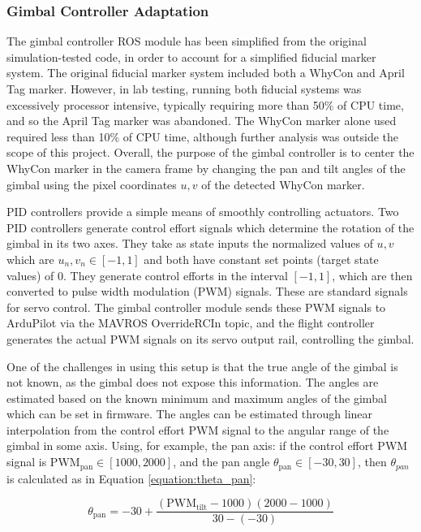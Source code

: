 \subsubsection{Gimbal Controller Adaptation}
\label{section:gimbal_controller_adapation}
The gimbal controller ROS module \cite{gimbal_controller_github} has been simplified from the original simulation-tested code, in order to account for a simplified fiducial marker system. The original fiducial marker system included both a WhyCon and April Tag marker. However, in lab testing, running both fiducial systems was excessively processor intensive, typically requiring more than 50\% of CPU time, and so the April Tag marker was abandoned. The WhyCon marker alone used required less than 10\% of CPU time, although further analysis was outside the scope of this project. Overall, the purpose of the gimbal controller is to center the WhyCon marker in the camera frame by changing the pan and tilt angles of the gimbal using the pixel coordinates $u,v$ of the detected WhyCon marker.

PID controllers provide a simple means of smoothly controlling actuators.\cite{pid_control} Two PID controllers generate control effort signals which determine the rotation of the gimbal in its two axes. They take as state inputs the normalized values of $u,v$ which are $u_n, v_n \in [-1,1]$ and both have constant set points (target state values) of 0. They generate control efforts in the interval $[-1, 1]$, which are then converted to pulse width modulation (PWM) signals. These are standard signals for servo control. The gimbal controller module sends these PWM signals to ArduPilot via the MAVROS OverrideRCIn topic, and the flight controller generates the actual PWM signals on its servo output rail, controlling the gimbal.

One of the challenges in using this setup is that the true angle of the gimbal is not known, as the gimbal does not expose this information. The angles are estimated based on the known minimum and maximum angles of the gimbal which can be set in firmware. The angles can be estimated through linear interpolation from the control effort PWM signal to the angular range of the gimbal in some axis. Using, for example, the pan axis: if the control effort PWM signal is $\mathrm{PWM}_\mathrm{pan} \in [1000, 2000]$, and the pan angle $\theta_\mathrm{pan} \in [-30, 30]$, then $\theta_{pan}$ is calculated as in Equation \eqref{equation:theta_pan}:

\begin{equation}
    \theta_\mathrm{pan} = -30 + \frac{(\mathrm{PWM}_\mathrm{tilt} - 1000)(2000 - 1000)}{30 - (-30)}
    \label{equation:theta_pan}
\end{equation}

